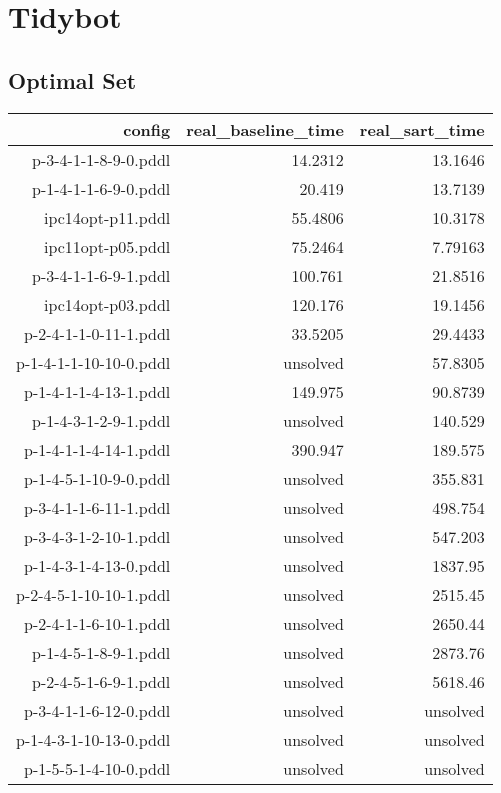 \documentclass{article}
\begin{document}
                \newpage \section{Tidybot}
                    \subsection*{Optimal Set}
                    
                            \begin{center}
                            \scriptsize
                            \begin{tabular}{r|r|r}
                            config & real\_baseline\_time & real\_sart\_time\\\midrule
                             p-3-4-1-1-8-9-0.pddl&14.2312&13.1646\\
 p-1-4-1-1-6-9-0.pddl&20.419&13.7139\\
 ipc14opt-p11.pddl&55.4806&10.3178\\
 ipc11opt-p05.pddl&75.2464&7.79163\\
 p-3-4-1-1-6-9-1.pddl&100.761&21.8516\\
 ipc14opt-p03.pddl&120.176&19.1456\\
 p-2-4-1-1-0-11-1.pddl&33.5205&29.4433\\
 p-1-4-1-1-10-10-0.pddl&unsolved&57.8305\\
 p-1-4-1-1-4-13-1.pddl&149.975&90.8739\\
 p-1-4-3-1-2-9-1.pddl&unsolved&140.529\\
 p-1-4-1-1-4-14-1.pddl&390.947&189.575\\
 p-1-4-5-1-10-9-0.pddl&unsolved&355.831\\
 p-3-4-1-1-6-11-1.pddl&unsolved&498.754\\
 p-3-4-3-1-2-10-1.pddl&unsolved&547.203\\
 p-1-4-3-1-4-13-0.pddl&unsolved&1837.95\\
 p-2-4-5-1-10-10-1.pddl&unsolved&2515.45\\
 p-2-4-1-1-6-10-1.pddl&unsolved&2650.44\\
 p-1-4-5-1-8-9-1.pddl&unsolved&2873.76\\
 p-2-4-5-1-6-9-1.pddl&unsolved&5618.46\\
 p-3-4-1-1-6-12-0.pddl&unsolved&unsolved\\
 p-1-4-3-1-10-13-0.pddl&unsolved&unsolved\\
 p-1-5-5-1-4-10-0.pddl&unsolved&unsolved\\

\end{tabular}
\end{center}
\end{document}
